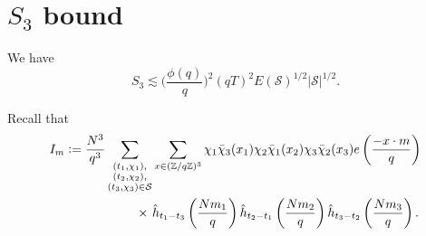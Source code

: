 \section{$S_3$ bound}
\begin{proposition}\label{s_3bound}
    We have \[
    S_3 \lesssim \Big(\frac{\phi(q)}{q}\Big)^2 (qT)^2 E(\mathcal{S})^{1/2} |\mathcal{S}|^{1/2}.
    \]
\end{proposition}
Recall that \begin{align*}
	I_m\defeq\frac{N^3}{q^3}\sum_{\substack{(t_1,\chi_1),\\(t_2,\chi_2),\\(t_3,\chi_3)\in\mathcal{S}}} &\sum_{x\in (\mathbb{Z}/q\mathbb{Z})^3}\chi_1\bar{\chi}_3(x_1)\chi_2\bar{\chi}_1(x_2)\chi_3\bar{\chi}_2(x_3) e\left(\frac{-x\cdot m}{q}\right)\\
	\times \ &\hat{h}_{t_1-t_3}\left(\frac{Nm_1}{q}\right)\hat{h}_{t_2-t_1}\left(\frac{Nm_2}{q}\right)\hat{h}_{t_3-t_2}\left(\frac{Nm_3}{q}\right).
\end{align*}

